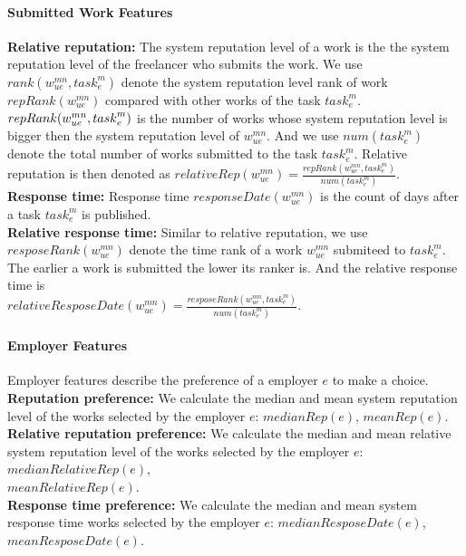 \paragraph{Submitted Work Features} 
\textbf{Relative reputation:} The system reputation level of a work is the the system reputation level of the freelancer who submits the work. We use $rank({w}_{ue}^{mn}, {task}_{e}^{m})$ denote the system reputation level rank of work $repRank({w}_{ue}^{mn})$ compared with other works of the task ${task}_{e}^{m}$. $repRank({w}_{ue}^{mn}, \\{task}_{e}^{m})$ is the number of works whose system reputation level is bigger then the system reputation level of ${w}_{ue}^{mn}$. And we use $num({task}_{e}^{m})$ denote the total number of works submitted to the task ${task}_{e}^{m}$. Relative reputation is then denoted as $relativeRep({w}_{ue}^{mn})=\frac{repRank({w}_{ue}^{mn}, {task}_{e}^{m})}{num({task}_{e}^{m})}$. \\
\textbf{Response time:} Response time $responseDate({w}_{ue}^{mn})$ is the count of days after a task  ${task}_{e}^{m}$ is published. \\
\textbf{Relative response time:} Similar to relative reputation, we use $resposeRank({w}_{ue}^{mn})$ denote the time rank of a work ${w}_{ue}^{mn}$ submiteed to ${task}_{e}^{m}$. The earlier a work is submitted the lower its ranker is. And the relative response time is \\$relativeResposeDate({w}_{ue}^{mn})=\frac{resposeRank({w}_{ue}^{mn}, {task}_{e}^{m})}{num({task}_{e}^{m})}$. \\
\paragraph{Employer Features} Employer features describe the preference of a employer $e$ to make a choice. \\
\textbf{Reputation preference:} We calculate the median and mean system reputation level of the works selected by the employer $e$: 
$medianRep(e)$, $meanRep(e)$. \\
\textbf{Relative reputation preference:} We calculate the median and mean relative system reputation level of the works selected by the employer $e$: $medianRelativeRep(e)$, \\$meanRelativeRep(e)$. \\
\textbf{Response time preference:} We calculate the median and mean system response time works selected by the employer $e$: $medianResposeDate(e)$, \\$meanResposeDate(e)$.\\
